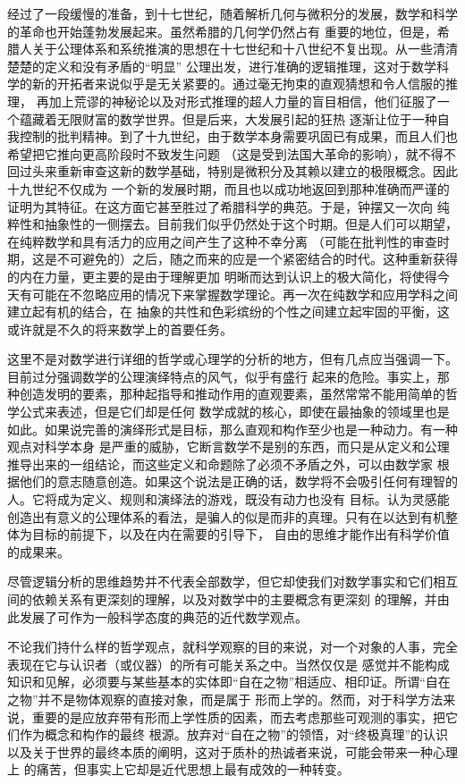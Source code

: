 经过了一段缓慢的准备，到十七世纪，随着解析几何与微积分的发展，数学和科学的革命也开始蓬勃发展起来。虽然希腊的几何学仍然占有
重要的地位，但是，希腊人关于公理体系和系统推演的思想在十七世纪和十八世纪不复出现。从一些清清楚楚的定义和没有矛盾的“明显”
公理出发，进行准确的逻辑推理，这对于数学科学的新的开拓者来说似乎是无关紧要的。通过毫无拘束的直观猜想和令人信服的推理，
再加上荒谬的神秘论以及对形式推理的超人力量的盲目相信，他们征服了一个蕴藏着无限财富的数学世界。但是后来，大发展引起的狂热
逐渐让位于一种自我控制的批判精神。到了十九世纪，由于数学本身需要巩固已有成果，而且人们也希望把它推向更高阶段时不致发生问题
（这是受到法国大革命的影响），就不得不回过头来重新审查这新的数学基础，特别是微积分及其赖以建立的极限概念。因此十九世纪不仅成为
一个新的发展时期，而且也以成功地返回到那种准确而严谨的证明为其特征。在这方面它甚至胜过了希腊科学的典范。于是，钟摆又一次向
纯粹性和抽象性的一侧摆去。目前我们似乎仍然处于这个时期。但是人们可以期望，在纯粹数学和具有活力的应用之间产生了这种不幸分离
（可能在批判性的审查时期，这是不可避免的）之后，随之而来的应是一个紧密结合的时代。这种重新获得的内在力量，更主要的是由于理解更加
明晰而达到认识上的极大简化，将使得今天有可能在不忽略应用的情况下来掌握数学理论。再一次在纯数学和应用学科之间建立起有机的结合，在
抽象的共性和色彩缤纷的个性之间建立起牢固的平衡，这或许就是不久的将来数学上的首要任务。

这里不是对数学进行详细的哲学或心理学的分析的地方，但有几点应当强调一下。目前过分强调数学的公理演绎特点的风气，似乎有盛行
起来的危险。事实上，那种创造发明的要素，那种起指导和推动作用的直观要素，虽然常常不能用简单的哲学公式来表述，但是它们却是任何
数学成就的核心，即使在最抽象的领域里也是如此。如果说完善的演绎形式是目标，那么直观和构作至少也是一种动力。有一种观点对科学本身
是严重的威胁，它断言数学不是别的东西，而只是从定义和公理推导出来的一组结论，而这些定义和命题除了必须不矛盾之外，可以由数学家
根据他们的意志随意创造。如果这个说法是正确的话，数学将不会吸引任何有理智的人。它将成为定义、规则和演绎法的游戏，既没有动力也没有
目标。认为灵感能创造出有意义的公理体系的看法，是骗人的似是而非的真理。只有在以达到有机整体为目标的前提下，以及在内在需要的引导下，
自由的思维才能作出有科学价值的成果来。

尽管逻辑分析的思维趋势并不代表全部数学，但它却使我们对数学事实和它们相互间的依赖关系有更深刻的理解，以及对数学中的主要概念有更深刻
的理解，并由此发展了可作为一般科学态度的典范的近代数学观点。

不论我们持什么样的哲学观点，就科学观察的目的来说，对一个对象的人事，完全表现在它与认识者（或仪器）的所有可能关系之中。当然仅仅是
感觉并不能构成知识和见解，必须要与某些基本的实体即“自在之物”相适应、相印证。所谓“自在之物”并不是物体观察的直接对象，而是属于
形而上学的。然而，对于科学方法来说，重要的是应放弃带有形而上学性质的因素，而去考虑那些可观测的事实，把它们作为概念和构作的最终
根源。放弃对“自在之物”的领悟，对“终极真理”的认识以及关于世界的最终本质的阐明，这对于质朴的热诚者来说，可能会带来一种心理上
的痛苦，但事实上它却是近代思想上最有成效的一种转变。